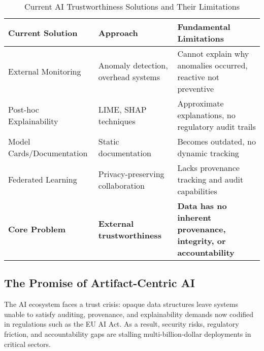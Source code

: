 \documentclass[conference]{IEEEtran}
\begin{document}
\begin{table*}[!t]
\renewcommand{\arraystretch}{1.3}
\caption{Current AI Trustworthiness Solutions and Their Limitations}
\label{tab:current-solutions-limitations}
\centering
\footnotesize
\begin{tabular}{p{3.5cm}p{5cm}p{5.5cm}}
\toprule
\textbf{Current Solution} & \textbf{Approach} & \textbf{Fundamental Limitations} \\
\midrule
External Monitoring & Anomaly detection, overhead systems & Cannot explain why anomalies occurred, reactive not preventive \\
Post-hoc Explainability & LIME, SHAP techniques & Approximate explanations, no regulatory audit trails \\
Model Cards/Documentation & Static documentation & Becomes outdated, no dynamic tracking \\
Federated Learning & Privacy-preserving collaboration & Lacks provenance tracking and audit capabilities \\
\textbf{Core Problem} & \textbf{External trustworthiness} & \textbf{Data has no inherent provenance, integrity, or accountability} \\
\bottomrule
\end{tabular}
\end{table*}

\subsection{The Promise of Artifact-Centric AI}

The AI ecosystem faces a trust crisis: opaque data structures leave systems unable to satisfy auditing, provenance, and explainability demands now codified in regulations such as the EU AI Act. As a result, security risks, regulatory friction, and accountability gaps are stalling multi-billion-dollar deployments in critical sectors.
\end{document}

